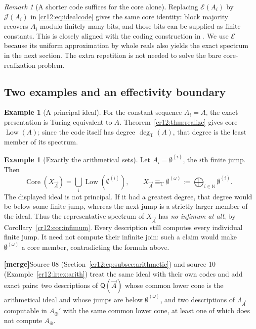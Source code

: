 \documentclass[11pt,letterpaper]{article}
\theoremstyle{plain}
\theoremstyle{definition}
\newtheorem{example}[theorem]{Example}
\theoremstyle{remark}
\newtheorem{remark}[theorem]{Remark}
\numberwithin{equation}{section}
\newcommand{\N}{\mathbb N}
\newcommand{\eqT}{\equiv_{\mathrm T}}
\newcommand{\Core}{\operatorname{Core}}
\newcommand{\Low}{\operatorname{Low}}
\newcommand{\degT}{\deg_{\mathrm T}}
\newcommand{\Ecode}{\mathcal E}
\newcommand{\Jcode}{\mathcal J}
\newcommand{\joinvec}{\bigoplus_{i\in\N}}
\newcommand{\mergenote}[1]{\par\smallskip\noindent
 {\small\textsf{\textbf{[merge]}}\enspace #1}\par\smallskip}
\newcommand{\Aplus}{A_{\oplus}}          %
\newcommand{\QQ}{\mathsf Q}              %
\newcommand{\Lam}{\Lambda_{\vec A}}      %
\begin{document}
\begin{remark}[A shorter code suffices for the core alone]\label{cr12:rem:shortcode}
Replacing $\Ecode(A_i)$ by $\Jcode(A_i)$ in \eqref{cr12:eq:idealcode} gives the same
core identity: block majority recovers $A_i$ modulo finitely many bits, and
those bits can be supplied as finite constants. This is closely aligned with
the coding construction in \cite[Theorem~3.11]{HJS}. We use $\Ecode$ because
its uniform approximation by whole reals also yields the exact spectrum in the
next section. The extra repetition is not needed to solve the bare
core-realization problem.
\end{remark}

\subsection{Two examples and an effectivity boundary}
\begin{example}[A principal ideal]
For the constant sequence $A_i=A$, the exact presentation is Turing equivalent
to $A$. Theorem~\ref{cr12:thm:realize} gives core $\Low(A)$; since the code itself
has degree $\degT(A)$, that degree is the least member of its spectrum.
\end{example}

\begin{example}[Exactly the arithmetical sets]\label{cr12:ex:arith}
Let $A_i=\emptyset^{(i)}$, the $i$th finite jump. Then
\[
 \Core(X_{\vec A})=
 \bigcup_i\Low(\emptyset^{(i)}),\qquad
 X_{\vec A}\eqT\emptyset^{(\omega)}
 :=\joinvec\emptyset^{(i)}.
\]
The displayed ideal is not principal. If it had a greatest degree, that degree
would be below some finite jump, whereas the next jump is a strictly larger
member of the ideal. Thus the representative spectrum of $X_{\vec A}$ has
\emph{no infimum at all}, by Corollary~\ref{cr12:cor:infimum}.
Every description still computes every individual finite jump. It need not
compute their infinite join: such a claim would make $\emptyset^{(\omega)}$
a core member, contradicting the formula above.
\end{example}
\mergenote{Source 08 (Section~\ref{cr12:ep:subsec:arithmetic}) and source 10
(Example~\ref{cr12:lr:ex:arith}) treat the same ideal with their own codes and add
exact pairs: two descriptions of $\QQ(\vec A)$ whose common lower cone is the
arithmetical ideal and whose jumps are below $\emptyset^{(\omega)}$, and two
descriptions of $\Lam$ computable in $\Aplus'$ with the same common lower cone, at
least one of which does not compute $\Aplus$.}
\end{document}
